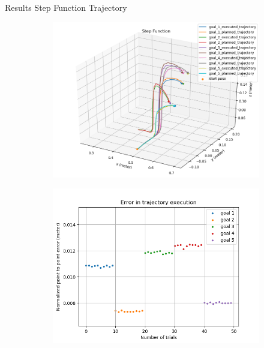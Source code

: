 \documentclass{beamer}
\begin{document}
	\begin{frame}{Results}
		Step Function Trajectory
		\begin{figure}
			\begin{subfigure}[b]{0.49\linewidth}
				\includegraphics[scale=0.25]{images/1/step.png}
			\end{subfigure}
			\begin{subfigure}[b]{0.49\linewidth}
				\includegraphics[scale=0.25]{images/1/step_e.png}
			\end{subfigure}	
		\end{figure}
	\end{frame}
\end{document}
